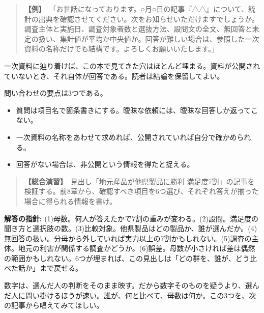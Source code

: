 \documentclass{article}
\begin{document}
\begin{quote}
\textbf{【例】}\ 「お世話になっております。○月○日の記事『△△』について、統計の出典を確認させてください。次をお知らせいただけますでしょうか。調査主体と実施日、調査対象者数と選抜方法、設問文の全文、無回答と未定の扱い、集計値が平均か中央値か。回答が難しい場合は、参照した一次資料の名称だけでも結構です。よろしくお願いいたします。」
\end{quote}

一次資料に辿り着けば、この本で見てきた穴はほとんど埋まる。資料が公開されていないとき、それ自体が回答である。読者は結論を保留してよい。

問い合わせの要点は3つである。

\begin{itemize}
\item 質問は項目名で箇条書きにする。曖昧な依頼には、曖昧な回答しか返ってこない。
\item 一次資料の名称をあわせて求めれば、公開されていれば自分で確かめられる。
\item 回答がない場合は、非公開という情報を得たと捉える。
\end{itemize}

\begin{quote}
\textbf{【総合演習】}\ 見出し「地元産品が他県製品に勝利 満足度7割」の記事を検証する。前8章から、確認すべき項目を6つ選び、それぞれ答えが揃った場合に得られる情報を書け。
\end{quote}

\textbf{解答の指針:} (1)母数。何人が答えたかで7割の重みが変わる。(2)設問。満足度の聞き方と選択肢の数。(3)比較対象。他県製品はどの製品か、誰が選んだか。(4)無回答の扱い。分母から外していれば実力以上の7割かもしれない。(5)調査の主体。地元の利害が関係する調査かどうか。(6)誤差。母数が小さければ差は偶然の範囲かもしれない。6つが埋まれば、この見出しは「どの群を、誰が、どう比べた話か」まで戻せる。

数字は、選んだ人の判断をそのまま映す。だから数字そのものを疑うより、選んだ人に問い掛けるほうが速い。誰が、何と比べて、母数は何か。この3つを、次の記事から唱えてみてほしい。
\end{document}
